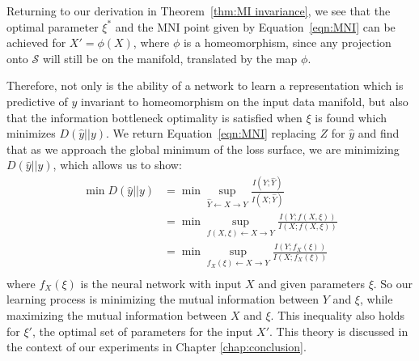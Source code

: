 Returning to our derivation in Theorem~\ref{thm:MI invariance}, we see that the optimal parameter $\xi^*$ and the MNI point given by Equation~\ref{eqn:MNI} can be achieved for $X' = \phi(X)$, where $\phi$ is a homeomorphism, since any projection onto $\mathcal{S}$ will still be on the manifold, translated by the map $\phi$.

Therefore, not only is the ability of a network to learn a representation which is predictive of $y$ invariant to homeomorphism on the input data manifold, but also that the information bottleneck optimality is satisfied when $\xi$ is found which minimizes $D(\hat{y}||y)$.
We return Equation~\ref{eqn:MNI} replacing $Z$ for $\hat{y}$ and find that as we approach the global minimum of the loss surface, we are minimizing $D(\hat{y}||y)$, which allows us to show:
\begin{align*}
\min D(\hat{y}||y) & = \min \sup_{\hat{Y} \leftarrow X \rightarrow Y}\frac{I(Y; \hat{Y})}{I(X; \hat{Y})} \\
& = \min \sup_{f(X, \xi) \leftarrow X \rightarrow Y} \frac{I(Y; f(X, \xi))}{I(X; f(X, \xi))} \\
& = \min \sup_{f_X(\xi) \leftarrow X \rightarrow Y} \frac{I(Y; f_X(\xi))}{I(X; f_X(\xi))} \\
\end{align*}
where $f_X(\xi)$ is the neural network with input $X$ and given parameters $\xi$.
So our learning process is minimizing the mutual information between $Y$ and $\xi$, while maximizing the mutual information between $X$ and $\xi$.
This inequality also holds for $\xi'$, the optimal set of parameters for the input $X'$.
This theory is discussed in the context of our experiments in Chapter \ref{chap:conclusion}.